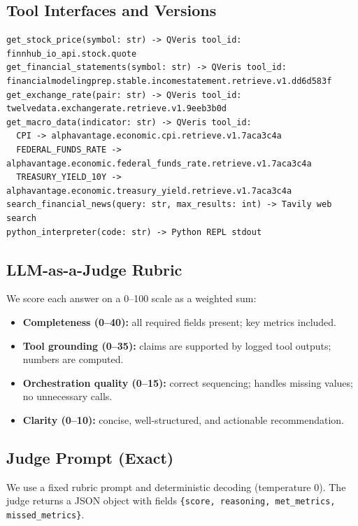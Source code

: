\documentclass{article}
\begin{document}
\subsection{Tool Interfaces and Versions}
\begin{lstlisting}
get_stock_price(symbol: str) -> QVeris tool_id: finnhub_io_api.stock.quote
get_financial_statements(symbol: str) -> QVeris tool_id: financialmodelingprep.stable.incomestatement.retrieve.v1.dd6d583f
get_exchange_rate(pair: str) -> QVeris tool_id: twelvedata.exchangerate.retrieve.v1.9eeb3b0d
get_macro_data(indicator: str) -> QVeris tool_id:
  CPI -> alphavantage.economic.cpi.retrieve.v1.7aca3c4a
  FEDERAL_FUNDS_RATE -> alphavantage.economic.federal_funds_rate.retrieve.v1.7aca3c4a
  TREASURY_YIELD_10Y -> alphavantage.economic.treasury_yield.retrieve.v1.7aca3c4a
search_financial_news(query: str, max_results: int) -> Tavily web search
python_interpreter(code: str) -> Python REPL stdout
\end{lstlisting}

\subsection{LLM-as-a-Judge Rubric}
We score each answer on a 0--100 scale as a weighted sum:
\begin{itemize}
  \item \textbf{Completeness (0--40):} all required fields present; key metrics included.
  \item \textbf{Tool grounding (0--35):} claims are supported by logged tool outputs; numbers are computed.
  \item \textbf{Orchestration quality (0--15):} correct sequencing; handles missing values; no unnecessary calls.
  \item \textbf{Clarity (0--10):} concise, well-structured, and actionable recommendation.
\end{itemize}

\subsection{Judge Prompt (Exact)}
We use a fixed rubric prompt and deterministic decoding (temperature 0). The judge returns a JSON object with fields \texttt{\{score, reasoning, met\_metrics, missed\_metrics\}}.
\end{document}
